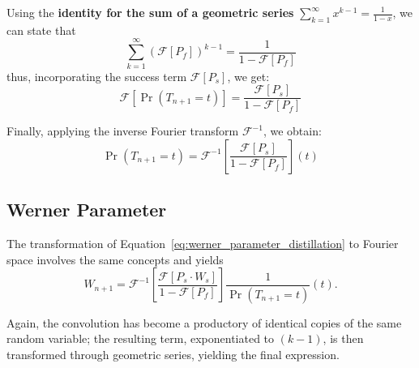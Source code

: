 \documentclass{masterthesis}
\begin{document}
Using the \textbf{identity for the sum of a geometric series} \(\sum_{k=1}^{\infty} x^{k-1} = \frac{1}{1-x}\), we can state that
\begin{equation}
    \sum_{k=1}^{\infty} \left( \mathcal{F}[P_f] \right)^{k-1} = \frac{1}{1 - \mathcal{F}[P_f]}
\end{equation}
thus, incorporating the success term \(\mathcal{F}[P_s]\), we get:
\begin{equation}
\mathcal{F}[\Pr(T_{n+1} = t)] = \frac{\mathcal{F}[P_s]}{1 - \mathcal{F}[P_f]}
\end{equation}

Finally, applying the inverse Fourier transform \(\mathcal{F}^{-1}\), we obtain:
\begin{equation}
    \Pr(T_{n+1} = t) = \mathcal{F}^{-1} \left[ \frac{\mathcal{F}[P_s]}{1 - \mathcal{F}[P_f]} \right](t)
\end{equation}

\subsection{Werner Parameter}

The transformation of Equation~\ref{eq:werner_parameter_distillation} to Fourier space involves the same concepts and yields
\begin{equation}\label{eq:werner_parameter_distillation_fourier}
    W_{n+1} = \mathcal{F}^{-1} \left[ \frac{\mathcal{F}[P_s \cdot W_s]}{1 - \mathcal{F}[P_f]} \right] \frac{1}{\Pr(T_{n+1}=t)}(t) .
\end{equation}

Again, the convolution has become a productory of identical copies of the same random variable; the resulting term, exponentiated to $(k-1)$, is then transformed through geometric series, yielding the final expression.


\end{document}
